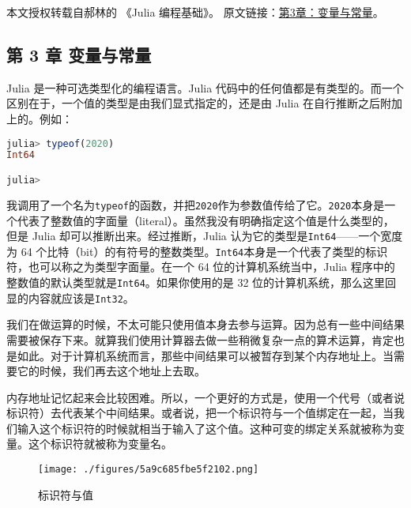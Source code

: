 
本文授权转载自郝林的 《Julia 编程基础》。 原文链接：\href{https://github.com/hyper0x/JuliaBasics/blob/master/book/ch03.md}{第3章：变量与常量}。


\subsection{第 3 章 变量与常量}

Julia 是一种可选类型化的编程语言。Julia 代码中的任何值都是有类型的。而一个区别在于，一个值的类型是由我们显式指定的，还是由 Julia 在自行推断之后附加上的。例如：

\begin{lstlisting}[language=julia]
julia> typeof(2020)
Int64

julia> 
\end{lstlisting}

我调用了一个名为\verb|typeof|的函数，并把\verb|2020|作为参数值传给了它。\verb|2020|本身是一个代表了整数值的字面量（literal）。虽然我没有明确指定这个值是什么类型的，但是 Julia 却可以推断出来。经过推断，Julia 认为它的类型是\verb|Int64|——一个宽度为 64 个比特（bit）的有符号的整数类型。\verb|Int64|本身是一个代表了类型的标识符，也可以称之为类型字面量。在一个 64 位的计算机系统当中，Julia 程序中的整数值的默认类型就是\verb|Int64|。如果你使用的是 32 位的计算机系统，那么这里回显的内容就应该是\verb|Int32|。

我们在做运算的时候，不太可能只使用值本身去参与运算。因为总有一些中间结果需要被保存下来。就算我们使用计算器去做一些稍微复杂一点的算术运算，肯定也是如此。对于计算机系统而言，那些中间结果可以被暂存到某个内存地址上。当需要它的时候，我们再去这个地址上去取。

内存地址记忆起来会比较困难。所以，一个更好的方式是，使用一个代号（或者说标识符）去代表某个中间结果。或者说，把一个标识符与一个值绑定在一起，当我们输入这个标识符的时候就相当于输入了这个值。这种可变的绑定关系就被称为变量。这个标识符就被称为变量名。

\begin{figure}[ht]
\centering
\texttt{[image: ./figures/5a9c685fbe5f2102.png]}
\caption{标识符与值} \label{fig_JuC3S0_1}
\end{figure}
